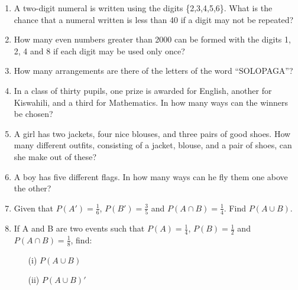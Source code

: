 \begin{enumerate}
	\item A two-digit numeral is written using the digits \{2,3,4,5,6\}. What is the chance that a numeral written is less than 40 if a digit may not be repeated?
	
	\item How many even numbers greater than 2000 can be formed with the digits 1, 2, 4 and 8 if each digit may be used only once?
	
	\item How many arrangements are there of the letters of the word ``SOLOPAGA''?
	
	\item In a class of thirty pupils, one prize is awarded for English, another for Kiswahili, and a third for Mathematics. In how many ways can the winners be chosen?
	
	\item A girl has two jackets, four nice blouses, and three pairs of good shoes. How many different outfits, consisting of a jacket, blouse, and a pair of shoes, can she make out of these?
	
	\item A boy has five different flags. In how many ways can he fly them one above the other?


	\item Given that $P(A') = \frac{1}{6}$, $P(B') = \frac{3}{5}$ and $P(A\cap B) = \frac{1}{4}$. Find $P(A\cup B)$.

	\item If A and B are two events such that $P(A) = \frac{1}{4}$, $P(B) = \frac{1}{2}$ and $P(A\cap B) = \frac{1}{8}$, find:
	\begin{itemize}
	\item[(i)] $P(A\cup B)$
	\item[(ii)] $P(A\cup B)'$
	\end{itemize}

\end{enumerate}


